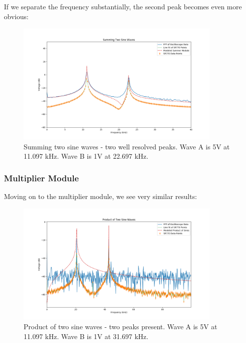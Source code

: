 \documentclass{article}
\begin{document}
If we separate the frequency substantially, the second peak becomes even more
obvious:

\begin{figure}[H]
    \centering
\begin{minipage}{11cm}
\begin{tcolorbox}
    \centering
        \includegraphics[width=10cm, height=6cm]{figures/figure13.png}
        \caption{Summing two sine waves - two well resolved peaks. Wave A is 5V
        at 11.097 kHz. Wave B is 1V at 22.697 kHz.}
        \label{fig:fig13}
\end{tcolorbox}
\end{minipage}
\end{figure}

\subsubsection{Multiplier Module}%
Moving on to the multiplier module, we see very similar results:

\begin{figure}[H]
    \centering
\begin{minipage}{11cm}
\begin{tcolorbox}
    \centering
        \includegraphics[width=10cm, height=6cm]{figures/figure14.png}
        \caption{Product of two sine waves - two peaks present. Wave A is 5V at
        11.097 kHz. Wave B is 1V at 31.697 kHz.}
        \label{fig:fig14}
\end{tcolorbox}
\end{minipage}
\end{figure}
\end{document}
